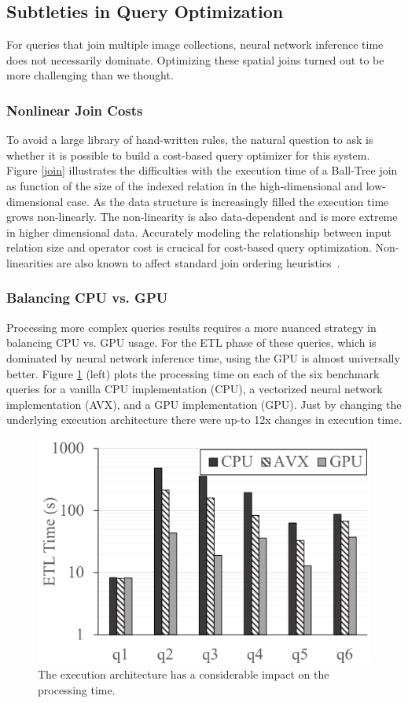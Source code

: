 \subsection{Subtleties in Query Optimization}
For queries that join multiple image collections, neural network inference time does not necessarily dominate.
Optimizing these spatial joins turned out to be more challenging than we thought.

\subsubsection{Nonlinear Join Costs}
To avoid a large library of hand-written rules, the natural question to ask is whether it is possible to build a cost-based query optimizer for this system.
Figure \ref{join} illustrates the difficulties with the execution time of a Ball-Tree join as function of the size of the indexed relation in the high-dimensional and low-dimensional case. As the data structure is increasingly filled the execution time grows non-linearly. The non-linearity is also data-dependent and is more extreme in higher dimensional data. Accurately modeling the relationship between input relation size and operator cost is crucical for cost-based query optimization. Non-linearities are also known to affect standard join ordering heuristics~\cite{krishnan2018deeprljoins}.

\subsubsection{Balancing CPU vs. GPU}
Processing more complex queries results requires a more nuanced strategy in balancing CPU vs. GPU usage. 
For the ETL phase of these queries, which is dominated by neural network inference time, using the GPU is almost universally better.
Figure \ref{build} (left) plots the processing time on each of the six benchmark queries for a vanilla CPU implementation (CPU), a vectorized neural network implementation (AVX), and a GPU implementation (GPU). Just by changing the underlying execution architecture there were up-to 12x changes in execution time. 


\begin{figure}[t]
\centering
 \includegraphics[width=0.48\columnwidth]{figures/build.png}
 \caption{The execution architecture has a considerable impact on the processing time.  \label{build} }
\end{figure}



